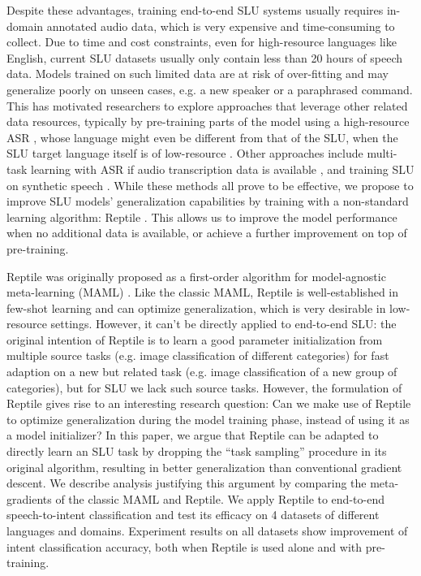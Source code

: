 \documentclass[a4paper]{article}
\begin{document}
	Despite these advantages, training end-to-end SLU systems usually requires in-domain annotated audio data, which is very expensive and time-consuming to collect. Due to time and cost constraints, even for high-resource languages like English, current SLU datasets usually only contain less than 20 hours of speech data. Models trained on such limited data are at risk of over-fitting and may generalize poorly on unseen cases, e.g. a new speaker or a paraphrased command. This has motivated researchers to explore approaches that leverage other related data resources, typically by pre-training parts of the model using a high-resource ASR \cite{chen2018spoken, CTCend2end2, Lugosch2019}, whose language might even be different from that of the SLU, when the SLU target language itself is of low-resource \cite{Bhosale2019}. Other approaches include multi-task learning with ASR if audio transcription data is available \cite{haghani2018audio}, and training SLU on synthetic speech \cite{lugosch2019using}. While these methods all prove to be effective, we propose to improve SLU \mbox{models'} generalization capabilities by training with a non-standard learning algorithm: Reptile \cite{Reptile}. This allows us to improve the model performance when no additional data is available, or achieve a further improvement on top of pre-training.
	
	Reptile was originally proposed as a first-order algorithm for model-agnostic meta-learning (MAML) \cite{finn2018learning}. Like the classic MAML, Reptile is well-established in few-shot learning and can optimize generalization, which is very desirable in low-resource settings. However, it can't be directly applied to end-to-end SLU: the original intention of Reptile is to learn a good parameter initialization from multiple source tasks (e.g. image classification of different categories) for fast adaption on a new but related task (e.g. image classification of a new group of categories), but for SLU we lack such source tasks. However, the formulation of Reptile gives rise to an interesting research question: Can we make use of Reptile to optimize generalization during the model training phase, instead of using it as a model initializer? In this paper, we argue that Reptile can be adapted to directly learn an SLU task by dropping the “task sampling” procedure in its original algorithm, resulting in better generalization than conventional gradient descent. We describe analysis justifying this argument by comparing the meta-gradients of the classic MAML and Reptile. We apply Reptile to end-to-end speech-to-intent classification and test its efficacy on 4 datasets of different languages and domains. Experiment results on all datasets show improvement of intent classification accuracy, both when Reptile is used alone and with pre-training.
	
\end{document}

